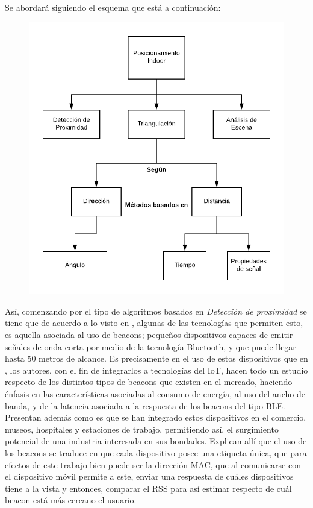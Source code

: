 Se abordará siguiendo el esquema que está a continuación:
\begin{figure}[h!]
    \centering
    \includegraphics[scale = 0.3]{./images/diagrama}
    \label{fig:diagrama}
\end{figure}

Así, comenzando por el tipo de algoritmos basados en \textit{Detección de proximidad} se tiene que de acuerdo a lo visto en \cite{6}, algunas de las tecnologías que permiten esto, es aquella asociada al uso de beacons; pequeños dispositivos capaces de emitir señales de onda corta por medio de la tecnología Bluetooth, y que puede llegar hasta 50 metros de alcance. Es precisamente en el uso de estos dispositivos que en \cite{20}, los autores, con el fin de integrarlos a tecnologías del IoT, hacen todo un estudio respecto de los distintos tipos de beacons que existen en el mercado, haciendo énfasis en las características asociadas al consumo de energía, al uso del ancho de banda, y de la latencia asociada a la respuesta de los beacons del tipo \ac{BLE}.\\

Presentan además como es que se han integrado estos dispositivos en el comercio, museos, hospitales y estaciones de trabajo, permitiendo así, el surgimiento potencial de una industria interesada en sus bondades. Explican allí que el uso de los beacons se traduce en que cada dispositivo posee una etiqueta única, que para efectos de este trabajo bien puede ser la dirección \ac{MAC}, que al comunicarse con el dispositivo móvil permite a este, enviar una respuesta de cuáles dispositivos tiene a la vista y entonces, comparar el \ac{RSS} para así estimar respecto de cuál beacon está más cercano el usuario.\\

